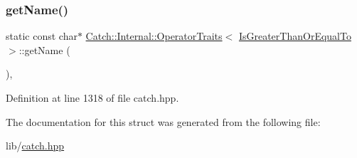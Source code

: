 \subsubsection{\texorpdfstring{get\+Name()}{getName()}}
{\footnotesize\ttfamily static const char$\ast$ \hyperlink{struct_catch_1_1_internal_1_1_operator_traits}{Catch\+::\+Internal\+::\+Operator\+Traits}$<$ \hyperlink{namespace_catch_1_1_internal_ae3f96598a7858155750bf38e7295d83ead2de7e9565e59e36c0987e402203ce1c}{Is\+Greater\+Than\+Or\+Equal\+To} $>$\+::get\+Name (\begin{DoxyParamCaption}{ }\end{DoxyParamCaption})\hspace{0.3cm}{\ttfamily [inline]}, {\ttfamily [static]}}



Definition at line 1318 of file catch.\+hpp.



The documentation for this struct was generated from the following file\+:\begin{DoxyCompactItemize}
\item 
lib/\hyperlink{catch_8hpp}{catch.\+hpp}\end{DoxyCompactItemize}
